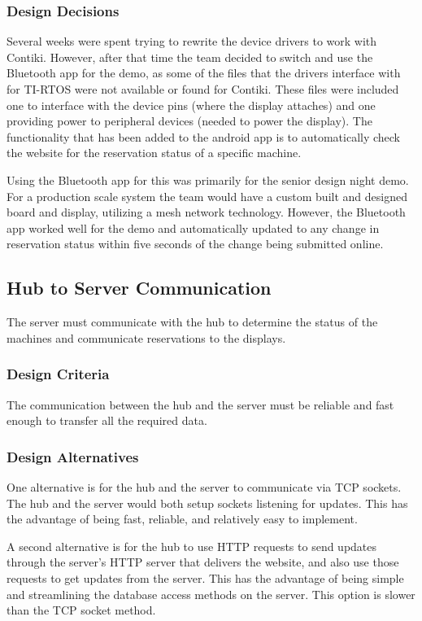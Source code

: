 \documentclass[PPFS.tex]{template/subfiles}
\begin{document}
\subsubsection{Design Decisions}
Several weeks were spent trying to rewrite the device drivers to work with Contiki. However, after that time the team decided to switch and use the Bluetooth app for the demo, as some of the files that the drivers interface with for TI-RTOS were not available or found for Contiki. These files were included one to interface with the device pins (where the display attaches) and one providing power to peripheral devices (needed to power the display). The functionality that has been added to the android app is to automatically check the website for the reservation status of a specific machine.

Using the Bluetooth app for this was primarily for the senior design night demo. For a production scale system the team would have a custom built and designed board and display, utilizing a mesh network technology. However, the Bluetooth app worked well for the demo and automatically updated to any change in reservation status within five seconds of the change being submitted online.

\subsection{Hub to Server Communication}
The server must communicate with the hub to determine the status of the machines and communicate reservations to the displays.

\subsubsection{Design Criteria}
The communication between the hub and the server must be reliable and fast enough to transfer all the required data.

\subsubsection{Design Alternatives}
One alternative is for the hub and the server to communicate via TCP sockets. The hub and the server would both setup sockets listening for updates. This has the advantage of being fast, reliable, and relatively easy to implement.

A second alternative is for the hub to use HTTP requests to send updates through the server's HTTP server that delivers the website, and also use those requests to get updates from the server. This has the advantage of being simple and streamlining the database access methods on the server. This option is slower than the TCP socket method.
\end{document}
